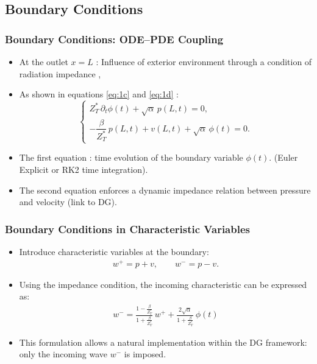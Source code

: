 \documentclass[11pt]{beamer}
\newcommand{\slideTitle}[1]{\begin{frame}\frametitle{#1}}
\begin{document}
\subsection{Boundary Conditions}

\slideTitle{Boundary Conditions: ODE--PDE Coupling}

\begin{itemize}
    \item At the outlet $x=L$ : Influence of exterior environment through a condition
    of radiation impedance \footnotemark[1],
    
    \item As shown in equations \eqref{eq:1c} and \eqref{eq:1d} :
    \begin{equation}
    \begin{cases}
        Z^\ast_T\,\partial_t \phi(t)
        + \sqrt{\alpha}\, p(L,t) = 0,
        \\[0.3em]
        -\dfrac{\beta}{Z^\ast_T}\, p(L,t)
        + v(L,t)
        + \sqrt{\alpha}\,\phi(t) = 0.
    \end{cases}
    \end{equation}

    \item The first equation : time evolution of the boundary variable $\phi(t)$. (Euler Explicit or RK2 time integration).
    \item The second equation enforces a dynamic impedance relation between pressure and velocity (link to DG).
\end{itemize}
\end{frame}

\slideTitle{Boundary Conditions in Characteristic Variables}

\begin{itemize}
    \item Introduce characteristic variables at the boundary:
    \begin{align}
        w^+ = p + v,
        \qquad
        w^- = p - v.
    \end{align}

    \item Using the impedance condition, the incoming characteristic can be expressed as:
    \begin{align}
        \boxed{
        w^- =
        \frac{1-\frac{\beta}{Z^\ast_T}}
             {1+\frac{\beta}{Z^\ast_T}}\, w^+
        +
        \frac{2\sqrt{\alpha}}
             {1+\frac{\beta}{Z^\ast_T}}\,\phi(t)
        }
    \end{align}

    \item This formulation allows a natural implementation within the DG framework:
    only the incoming wave $w^-$ is imposed.
\end{itemize}
\end{frame}
\end{document}
